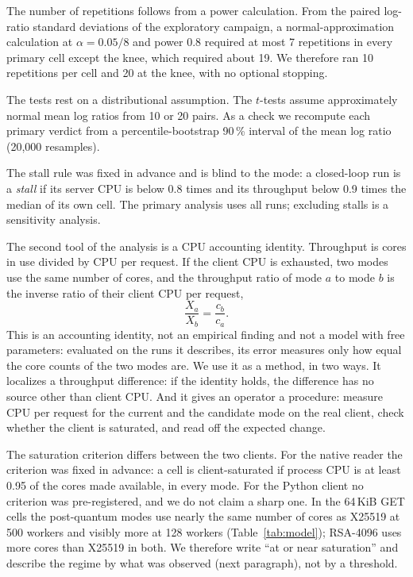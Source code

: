 \documentclass[review,12pt]{elsarticle}
\begin{document}
The number of repetitions follows from a power calculation. From the paired log-ratio standard deviations of the exploratory campaign, a
normal-approximation calculation at $\alpha=0.05/8$ and power 0.8 required at most 7 repetitions
in every primary cell except the knee, which required about 19. We therefore ran 10 repetitions
per cell and 20 at the knee, with no optional stopping.

The tests rest on a distributional assumption. The $t$-tests assume approximately normal mean log ratios
from 10 or 20 pairs. As a check we recompute each primary verdict from a percentile-bootstrap
90\,\% interval of the mean log ratio (20{,}000 resamples).

The stall rule was fixed in advance and is blind to the mode: a closed-loop run is a \emph{stall}
if its server CPU is below 0.8 times and its throughput below 0.9 times the median of its own
cell. The primary analysis uses all runs; excluding stalls is a sensitivity analysis.

The second tool of the analysis is a CPU accounting identity.
Throughput is cores in use divided by CPU per request. If the client CPU is exhausted, two modes
use the same number of cores, and the throughput ratio of mode $a$ to mode $b$ is the inverse
ratio of their client CPU per request,
\[\frac{X_a}{X_b}=\frac{c_b}{c_a}.\]
This is an accounting identity, not an empirical finding and not a model with free parameters:
evaluated on the runs it describes, its error measures only how equal the core counts of the two
modes are. We use it as a method, in two ways. It localizes a throughput difference: if the
identity holds, the difference has no source other than client CPU. And it gives an operator a
procedure: measure CPU per request for the current and the candidate mode on the real client,
check whether the client is saturated, and read off the expected change.

The saturation criterion differs between the two clients. For the native reader the criterion was fixed in advance: a cell
is client-saturated if process CPU is at least 0.95 of the cores made available, in every mode.
For the Python client no criterion was pre-registered, and we do not claim a sharp one. In the
64\,KiB GET cells the post-quantum modes use nearly the same number of cores as X25519 at 500
workers and visibly more at 128 workers (Table~\ref{tab:model}); RSA-4096 uses more cores than
X25519 in both. We therefore write ``at or near saturation'' and describe the regime by what
was observed (next paragraph), not by a threshold.
\end{document}
